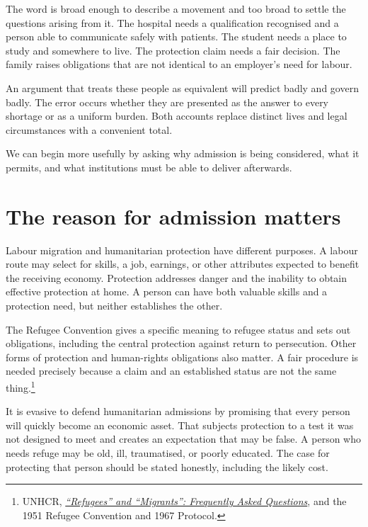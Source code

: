 \documentclass[12pt,a4paper]{book}
\begin{document}
The word is broad enough to describe a movement and too broad to settle the questions arising from it. The hospital needs a qualification recognised and a person able to communicate safely with patients. The student needs a place to study and somewhere to live. The protection claim needs a fair decision. The family raises obligations that are not identical to an employer's need for labour.

An argument that treats these people as equivalent will predict badly and govern badly. The error occurs whether they are presented as the answer to every shortage or as a uniform burden. Both accounts replace distinct lives and legal circumstances with a convenient total.

We can begin more usefully by asking why admission is being considered, what it permits, and what institutions must be able to deliver afterwards.

\section*{The reason for admission matters}

Labour migration and humanitarian protection have different purposes. A labour route may select for skills, a job, earnings, or other attributes expected to benefit the receiving economy. Protection addresses danger and the inability to obtain effective protection at home. A person can have both valuable skills and a protection need, but neither establishes the other.

The Refugee Convention gives a specific meaning to refugee status and sets out obligations, including the central protection against return to persecution. Other forms of protection and human-rights obligations also matter. A fair procedure is needed precisely because a claim and an established status are not the same thing.\footnote{UNHCR, \href{https://www.unhcr.org/africa/news/stories/refugees-and-migrants-frequently-asked-questions-faqs}{\emph{``Refugees'' and ``Migrants'': Frequently Asked Questions}}, and the 1951 Refugee Convention and 1967 Protocol.}

It is evasive to defend humanitarian admissions by promising that every person will quickly become an economic asset. That subjects protection to a test it was not designed to meet and creates an expectation that may be false. A person who needs refuge may be old, ill, traumatised, or poorly educated. The case for protecting that person should be stated honestly, including the likely cost.
\end{document}
